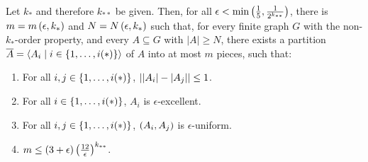     \theorem[Theorem 5.18]\label{minimal_conditions_for_excellent_partitions}
        Let $k_*$ and therefore $k_{**}$ be given.
        Then, for all $\epsilon < \min \left( \frac{1}{5}, \frac{1}{2^{k_{**}}} \right)$, there is $m = m\left( \epsilon, k_* \right)$
        and $N = N\left( \epsilon, k_* \right)$ such that, for every finite graph $G$ with the non-$k_{*}$-order property, and
        every $A \subseteq G$ with $|A| \geq N$, there exists a partition $\overline{A} = \left< A_i \mid i \in \left\{ 1, \dots, i(*) \right\} \right>$
        of $A$ into at most $m$ pieces, such that:
        \begin{enumerate}
            \item \label{itm:5.18.1} For all $i, j \in \left\{ 1, \dots, i(*) \right\}$, $\left| \left| A_i \right|- \left| A_j \right| \right| \leq 1$.
            \item \label{itm:5.18.2} For all $i \in \left\{ 1, \dots, i(*) \right\}$, $A_i$ is $\epsilon$-excellent.
            \item \label{itm:5.18.3} For all $i, j \in \left\{ 1, \dots, i(*) \right\}$, $\left( A_i, A_j \right)$ is $\epsilon$-uniform.
            \item \label{itm:5.18.4} $m \leq \left( 3 + \epsilon \right) \left( \frac{12}{\epsilon} \right)^{k_{**}}$.
        \end{enumerate}
